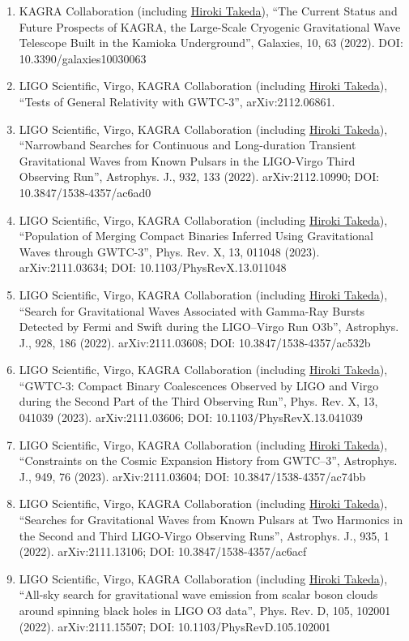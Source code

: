 \documentclass[uplatex, 12pt]{article}
\begin{document}
\begin{enumerate}
\item KAGRA Collaboration (including \uline{Hiroki Takeda}), “The Current Status and Future Prospects of KAGRA, the Large-Scale Cryogenic Gravitational Wave Telescope Built in the Kamioka Underground”, Galaxies, 10, 63 (2022). DOI: 10.3390/galaxies10030063
\item LIGO Scientific, Virgo, KAGRA Collaboration (including \uline{Hiroki Takeda}), “Tests of General Relativity with GWTC-3”, arXiv:2112.06861.
\item LIGO Scientific, Virgo, KAGRA Collaboration (including \uline{Hiroki Takeda}), “Narrowband Searches for Continuous and Long-duration Transient Gravitational Waves from Known Pulsars in the LIGO-Virgo Third Observing Run”, Astrophys. J., 932, 133 (2022). arXiv:2112.10990; DOI: 10.3847/1538-4357/ac6ad0
\item LIGO Scientific, Virgo, KAGRA Collaboration (including \uline{Hiroki Takeda}), “Population of Merging Compact Binaries Inferred Using Gravitational Waves through GWTC-3”, Phys. Rev. X, 13, 011048 (2023). arXiv:2111.03634; DOI: 10.1103/PhysRevX.13.011048
\item LIGO Scientific, Virgo, KAGRA Collaboration (including \uline{Hiroki Takeda}), “Search for Gravitational Waves Associated with Gamma-Ray Bursts Detected by Fermi and Swift during the LIGO--Virgo Run O3b”, Astrophys. J., 928, 186 (2022). arXiv:2111.03608; DOI: 10.3847/1538-4357/ac532b
\item LIGO Scientific, Virgo, KAGRA Collaboration (including \uline{Hiroki Takeda}), “GWTC-3: Compact Binary Coalescences Observed by LIGO and Virgo during the Second Part of the Third Observing Run”, Phys. Rev. X, 13, 041039 (2023). arXiv:2111.03606; DOI: 10.1103/PhysRevX.13.041039
\item LIGO Scientific, Virgo, KAGRA Collaboration (including \uline{Hiroki Takeda}), “Constraints on the Cosmic Expansion History from GWTC--3”, Astrophys. J., 949, 76 (2023). arXiv:2111.03604; DOI: 10.3847/1538-4357/ac74bb
\item LIGO Scientific, Virgo, KAGRA Collaboration (including \uline{Hiroki Takeda}), “Searches for Gravitational Waves from Known Pulsars at Two Harmonics in the Second and Third LIGO-Virgo Observing Runs”, Astrophys. J., 935, 1 (2022). arXiv:2111.13106; DOI: 10.3847/1538-4357/ac6acf
\item LIGO Scientific, Virgo, KAGRA Collaboration (including \uline{Hiroki Takeda}), “All-sky search for gravitational wave emission from scalar boson clouds around spinning black holes in LIGO O3 data”, Phys. Rev. D, 105, 102001 (2022). arXiv:2111.15507; DOI: 10.1103/PhysRevD.105.102001

\end{enumerate}
\end{document}
